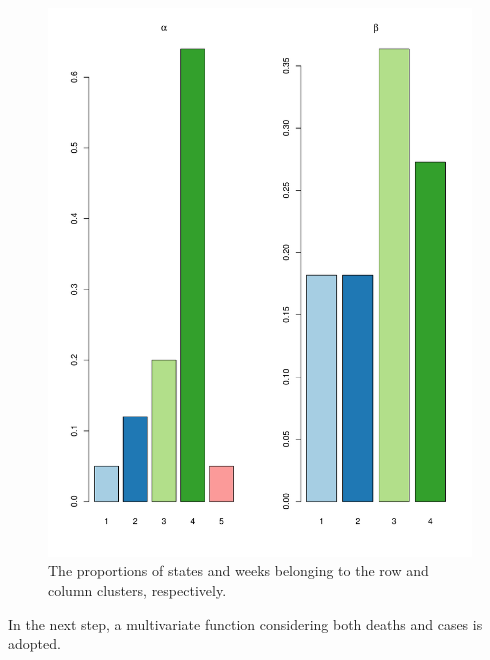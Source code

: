 \documentclass[12pt,a4paper]{article}
\begin{document}
\begin{figure}[H]
	\begin{center}
		\includegraphics[width=\columnwidth]{Deaths_prop.pdf}
		\caption{The proportions of states and weeks belonging to the row and column clusters, respectively.}
		
	\end{center}
\end{figure}

In the next step, a multivariate function considering both deaths and cases is adopted.
%
%
\end{document}
